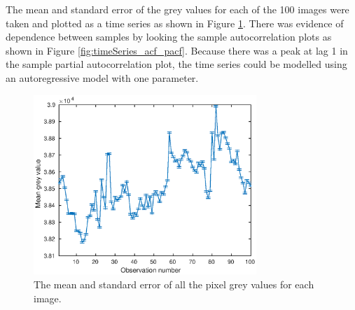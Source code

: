 \documentclass[12pt]{report}
\begin{document}
The mean and standard error of the grey values for each of the 100 images were taken and plotted as a time series as shown in Figure \ref{fig:timeSeries}. There was evidence of dependence between samples by looking the sample autocorrelation plots as shown in Figure \ref{fig:timeSeries_acf_pacf}. Because there was a peak at lag 1 in the sample partial autocorrelation plot, the time series could be modelled using an autoregressive model with one parameter.

\begin{figure}
	\centering
	\includegraphics[width=0.75\textwidth]{figures/initial_timeSeries.eps}
	\caption{The mean and standard error of all the pixel grey values for each image.}
	\label{fig:timeSeries}
\end{figure}
\end{document}
